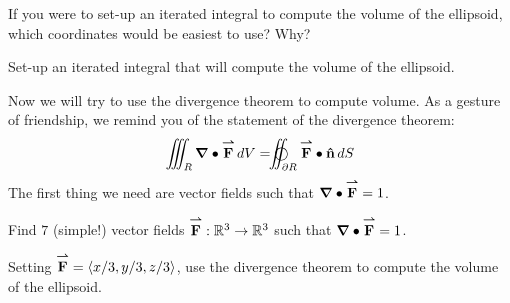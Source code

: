 \documentclass[nooutcomes,noauthor]{ximera}
\begin{document}
\begin{problem}
  If you were to set-up an iterated integral to compute the volume of
  the ellipsoid, which coordinates would be easiest to use? Why?
\end{problem}

\begin{problem}
  Set-up an iterated integral that will compute the volume of the
  ellipsoid.
\end{problem}

Now we will try to use the divergence theorem to compute volume. As a
gesture of friendship, we remind you of the statement of the
divergence theorem:
  \[
  \iiint_R \divergence \vec{F}  \d V =   \oiint_{\partial R} \vec{F}\dotp\uvec{n}\d S
  \]
The first thing we need are vector fields such that
$\boldsymbol\nabla\bullet {\overset{\boldsymbol{\rightharpoonup}}{\mathbf{F}}} = 1$.

\begin{problem}
  Find $7$ (simple!) vector fields ${\overset{\boldsymbol{\rightharpoonup}}{\mathbf{F}}}: \mathbb R^3\to\mathbb R^3$ such that
  $\boldsymbol\nabla\bullet{\overset{\boldsymbol{\rightharpoonup}}{\mathbf{F}}} =1$.
\end{problem}

\begin{problem}
  Setting ${\overset{\boldsymbol{\rightharpoonup}}{\mathbf{F}}} = \left\langle x/3,y/3,z/3\right\rangle$, use the divergence theorem
  to compute the volume of the ellipsoid.
\end{problem}
\end{document}
